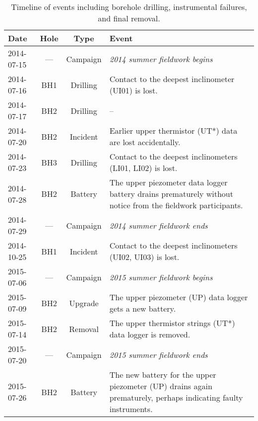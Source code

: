 \documentclass[utf8]{article}
\begin{document}
    \begin{table}
      \caption{%
        Timeline of events including borehole drilling, instrumental failures,
        and final removal.}
      \label{tab:timeline}
      {\begin{tabular}{lccp{95mm}}
        \hline
        Date       & Hole & Type      & Event \\
        \hline
        2014-07-15 & ---  & Campaign & \emph{2014 summer fieldwork begins} \\
        2014-07-16 & BH1  & Drilling & Contact to the deepest inclinometer
                                       (UI01) is lost. \\
        2014-07-17 & BH2  & Drilling & -- \\
        2014-07-20 & BH2  & Incident & Earlier upper thermistor (UT*) data are
                                       lost accidentally. \\
        2014-07-23 & BH3  & Drilling & Contact to the deepest inclinometers
                                       (LI01, LI02) is lost. \\
        2014-07-28 & BH2  & Battery  & The upper piezometer data logger battery
                                       drains prematurely without notice from
                                       the fieldwork participants. \\
        2014-07-29 & ---  & Campaign & \emph{2014 summer fieldwork ends} \\
        \hline
        2014-10-25 & BH1  & Incident & Contact to the deepest inclinometers
                                       (UI02, UI03) is lost. \\
        \hline
        2015-07-06 & ---  & Campaign & \emph{2015 summer fieldwork begins} \\
        2015-07-09 & BH2  & Upgrade  & The upper piezometer (UP) data logger
                                       gets a new battery. \\
        2015-07-14 & BH2  & Removal  & The upper thermistor strings (UT*) data
                                       logger is removed. \\
        2015-07-20 & ---  & Campaign & \emph{2015 summer fieldwork ends} \\
        \hline
        2015-07-26 & BH2  & Battery  & The new battery for the upper piezometer
                                       (UP) drains again prematurely, perhaps
                                       indicating faulty instruments. \\

\end{tabular}}
\end{table}
\end{document}
